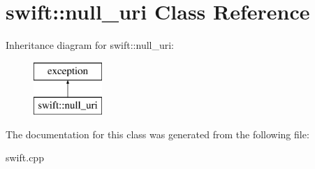 \hypertarget{classswift_1_1null__uri}{\section{swift\-:\-:null\-\_\-uri Class Reference}
\label{classswift_1_1null__uri}
}
Inheritance diagram for swift\-:\-:null\-\_\-uri\-:\begin{figure}[H]
\begin{center}
\leavevmode
\includegraphics[height=2.000000cm]{classswift_1_1null__uri}
\end{center}
\end{figure}


The documentation for this class was generated from the following file\-:\begin{DoxyCompactItemize}
\item 
swift.\-cpp\end{DoxyCompactItemize}
